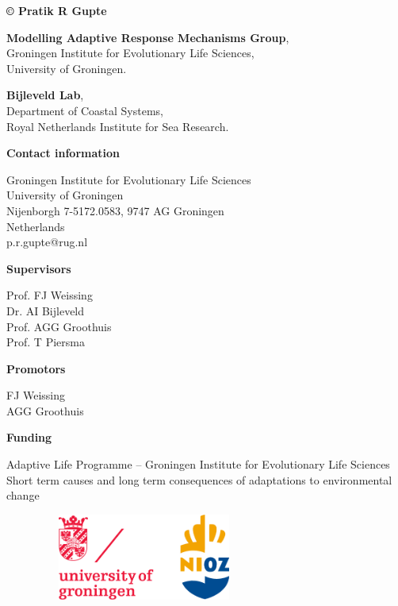 {\parindent0pt

\textbf{© Pratik R Gupte}

\textbf{Modelling Adaptive Response Mechanisms Group},\\
Groningen Institute for Evolutionary Life Sciences,\\
University of Groningen.

\textbf{Bijleveld Lab},\\
Department of Coastal Systems,\\
Royal Netherlands Institute for Sea Research.

\textbf{Contact information}

Groningen Institute for Evolutionary Life Sciences\\
University of Groningen\\
Nijenborgh 7-5172.0583, 9747 AG Groningen\\
Netherlands\\
p.r.gupte@rug.nl

\textbf{Supervisors}

Prof. FJ Weissing\\
Dr. AI Bijleveld\\
Prof. AGG Groothuis\\
Prof. T Piersma

\textbf{Promotors}

FJ Weissing\\
AGG Groothuis

\textbf{Funding}

Adaptive Life Programme -- Groningen Institute for Evolutionary Life
Sciences\\
Short term causes and long term consequences of adaptations to
environmental change

\begin{figure}[h!]
	
	\includegraphics[width=200pt, height = 80pt]{logo_affils.eps}
	
	\label{fig:logoaffils}
\end{figure}
}

\newpage

\tableofcontents

\newpage

